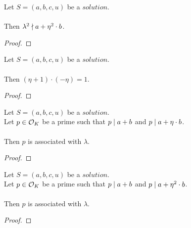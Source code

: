 \begin{lemma}
    \label{lmm:lambda_sq_not_dvd_a_add_eta_sq_mul_b}
    \leanok
    Let $S=(a, b, c, u)$ be a $solution$.\\\\
    Then $\lambda^2 \nmid a + \eta^2 \cdot b$.
\end{lemma}
\begin{proof}
    \leanok
\end{proof}

\begin{lemma}
    \label{lmm:eta_add_one_inv}
    \leanok
    Let $S=(a, b, c, u)$ be a $solution$.\\\\
    Then $(\eta + 1) \cdot (-\eta) = 1$.
\end{lemma}
\begin{proof}
    \leanok
\end{proof}

\begin{lemma}
    \label{lmm:associated_of_dvd_a_add_b_of_dvd_a_add_eta_mul_b}
    \leanok
    Let $S=(a, b, c, u)$ be a $solution$.\\
    Let $p \in \mathcal{O}_K$ be a prime such that $p \mid a+b$
    and $p \mid a+\eta \cdot b$.\\\\
    Then $p$ is associated with $\lambda$.
\end{lemma}
\begin{proof}
    \leanok
\end{proof}

\begin{lemma}
    \label{lmm:associated_of_dvd_a_add_b_of_dvd_a_add_eta_sq__mul_b}
    \leanok
    Let $S=(a, b, c, u)$ be a $solution$.\\
    Let $p \in \mathcal{O}_K$ be a prime such that $p \mid a+b$
    and $p \mid a+\eta^2 \cdot b$.\\\\
    Then $p$ is associated with $\lambda$.
\end{lemma}
\begin{proof}
    \leanok
\end{proof}

